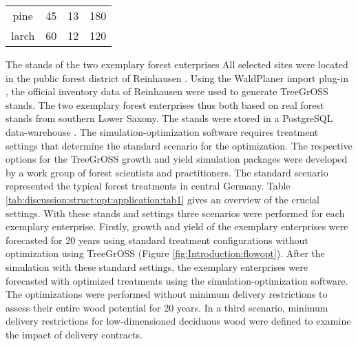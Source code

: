 \begin{table}[h]
\begin{tabular}{cccc}
		pine        & 45                                                                 & 13                                                                                  & 180                                                                                \\
		larch        & 60                                                                 & 12                                                                                  & 120                                                                                \\ \hline
	\end{tabular}
\end{table}

The stands of the two exemplary forest enterprises 
All selected sites were located in the public forest district of Reinhausen \citep{nlf_2017}. Using the WaldPlaner import plug-in \citep[p. 58]{hansen_2014}, the official inventory data of Reinhausen were used to generate TreeGrOSS stands. The two exemplary forest enterprises thus both based on real forest stands from southern Lower Saxony. The stands were stored in a PostgreSQL data-warehouse \citep{eisentraut_2003}. The si\-mu\-la\-tion-op\-ti\-mi\-za\-tion software requires treatment settings that determine the standard scenario for the optimization. The respective options for the TreeGrOSS growth and yield simulation packages were developed by a work group of forest scientists and practitioners. The standard scenario represented the typical forest treatments in central Germany. Table \ref{tab:discussion:struct:opt:application:tab1} gives an overview of the crucial settings. With these stands and settings three scenarios were performed for each exemplary enterprise. Firstly, growth and yield of the exemplary enterprises were forecasted for 20 years using standard treatment configurations without optimization using TreeGrOSS (Figure \ref{fig:Introduction:flowopt}). After the simulation with these standard settings, the exemplary enterprises were forecasted with optimized treatments using the si\-mu\-la\-tion-op\-ti\-mi\-za\-tion software. The optimizations were  performed without minimum delivery restrictions to assess their entire wood potential for 20 years. In a third scenario, minimum delivery restrictions for low-dimensioned deciduous wood were defined to examine the impact of delivery contracts.
%



